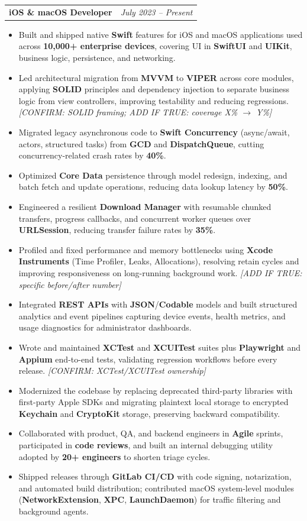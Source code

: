 \documentclass[letterpaper,11pt]{article}
\makeatletter
\newcommand{\resumeItem}[1]{\item\small{{#1 \vspace{-2pt}}}}
\newcommand{\resumeRole}[2]{
    \item
    \begin{tabular*}{0.97\textwidth}{l@{\extracolsep{\fill}}r}
      \textbf{\small#1} & \textit{\small #2} \\
    \end{tabular*}\vspace{-7pt}
}
\newcommand{\resumeItemListStart}{\begin{itemize}}
\newcommand{\resumeItemListEnd}{\end{itemize}\vspace{-5pt}}
\makeatother
\begin{document}
        \resumeRole{iOS \& macOS Developer}{July 2023 -- Present}
            \resumeItemListStart
                \resumeItem{Built and shipped native \textbf{Swift} features for iOS and macOS applications used across \textbf{10,000+ enterprise devices}, covering UI in \textbf{SwiftUI} and \textbf{UIKit}, business logic, persistence, and networking.}
                \resumeItem{Led architectural migration from \textbf{MVVM} to \textbf{VIPER} across core modules, applying \textbf{SOLID} principles and dependency injection to separate business logic from view controllers, improving testability and reducing regressions. \textit{[CONFIRM: SOLID framing; ADD IF TRUE: coverage X\% $\rightarrow$ Y\%]}}
                \resumeItem{Migrated legacy asynchronous code to \textbf{Swift Concurrency} (async/await, actors, structured tasks) from \textbf{GCD} and \textbf{DispatchQueue}, cutting concurrency-related crash rates by \textbf{40\%}.}
                \resumeItem{Optimized \textbf{Core Data} persistence through model redesign, indexing, and batch fetch and update operations, reducing data lookup latency by \textbf{50\%}.}
                \resumeItem{Engineered a resilient \textbf{Download Manager} with resumable chunked transfers, progress callbacks, and concurrent worker queues over \textbf{URLSession}, reducing transfer failure rates by \textbf{35\%}.}
                \resumeItem{Profiled and fixed performance and memory bottlenecks using \textbf{Xcode Instruments} (Time Profiler, Leaks, Allocations), resolving retain cycles and improving responsiveness on long-running background work. \textit{[ADD IF TRUE: specific before/after number]}}
                \resumeItem{Integrated \textbf{REST APIs} with \textbf{JSON}/\textbf{Codable} models and built structured analytics and event pipelines capturing device events, health metrics, and usage diagnostics for administrator dashboards.}
                \resumeItem{Wrote and maintained \textbf{XCTest} and \textbf{XCUITest} suites plus \textbf{Playwright} and \textbf{Appium} end-to-end tests, validating regression workflows before every release. \textit{[CONFIRM: XCTest/XCUITest ownership]}}
                \resumeItem{Modernized the codebase by replacing deprecated third-party libraries with first-party Apple SDKs and migrating plaintext local storage to encrypted \textbf{Keychain} and \textbf{CryptoKit} storage, preserving backward compatibility.}
                \resumeItem{Collaborated with product, QA, and backend engineers in \textbf{Agile} sprints, participated in \textbf{code reviews}, and built an internal debugging utility adopted by \textbf{20+ engineers} to shorten triage cycles.}
                \resumeItem{Shipped releases through \textbf{GitLab CI/CD} with code signing, notarization, and automated build distribution; contributed macOS system-level modules (\textbf{NetworkExtension}, \textbf{XPC}, \textbf{LaunchDaemon}) for traffic filtering and background agents.}
            \resumeItemListEnd
\end{document}
